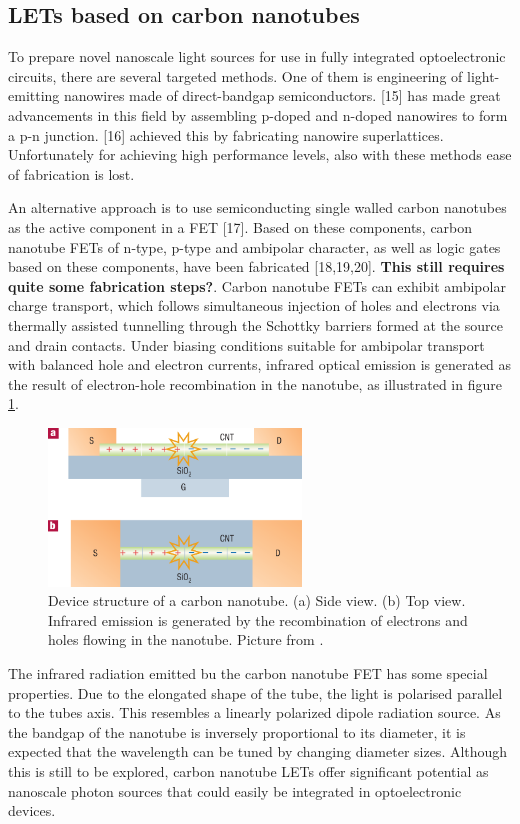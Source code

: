 \subsection{LETs based on carbon nanotubes} %

To prepare novel nanoscale light sources for use in fully integrated optoelectronic circuits, there are several targeted methods. One of them is engineering of light-emitting nanowires made of direct-bandgap semiconductors. [15] has made great advancements in this field by assembling p-doped and n-doped nanowires to form a p-n junction. [16] achieved this by fabricating nanowire superlattices. Unfortunately for achieving high performance levels, also with these methods ease of fabrication is lost.

An alternative approach is to use semiconducting single walled carbon nanotubes as the active component in a FET [17]. Based on these components, carbon nanotube FETs of n-type, p-type and ambipolar character, as well as logic gates based on these components, have been fabricated [18,19,20]. \textbf{This still requires quite some fabrication steps?}. Carbon nanotube FETs can exhibit ambipolar charge transport, which follows simultaneous injection of holes and electrons via thermally assisted tunnelling through the Schottky barriers formed at the source and drain contacts. Under biasing conditions suitable for ambipolar transport with balanced hole and electron currents, infrared optical emission is generated as the result of electron-hole recombination in the nanotube, as illustrated in figure \ref{fig:carbontube}. 

\begin{figure}[!ht]
 \begin{center}
  \includegraphics[width=0.6\textwidth]{fig_1}
  \caption{Device structure of a carbon nanotube. (a) Side view. (b) Top view. Infrared emission is generated by the recombination of electrons and holes flowing in the nanotube. Picture from \citet{Muccini}.}
  \label{fig:carbontube}
 \end{center}
\end{figure}

The infrared radiation emitted bu the carbon nanotube FET has some special properties. Due to the elongated shape of the tube, the light is polarised parallel to the tubes axis. This resembles a linearly polarized dipole radiation source. As the bandgap of the nanotube is inversely proportional to its diameter, it is expected that the wavelength can be tuned by changing diameter sizes. Although this is still to be explored, carbon nanotube LETs offer significant potential as nanoscale photon sources that could easily be integrated in optoelectronic devices.


